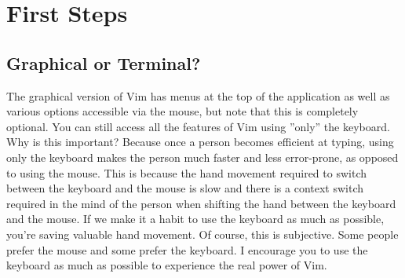 \section{First Steps}
\subsection{Graphical or Terminal?} 
The graphical version of Vim has menus at the top of the application as well as
various options accessible via the mouse, but note that this is completely
optional. You can still access all the features of Vim using ''only'' the
keyboard. Why is this important? Because once a person becomes efficient at
typing, using only the keyboard makes the person much faster and less
error-prone, as opposed to using the mouse. This is because the hand movement
required to switch between the keyboard and the mouse is slow and there is a
context switch required in the mind of the person when shifting the hand
between the keyboard and the mouse. If we make it a habit to use the keyboard
as much as possible, you're saving valuable hand movement. Of course, this is
subjective. Some people prefer the mouse and some prefer the keyboard.  I
encourage you to use the keyboard as much as possible to experience the real
power of Vim. 
